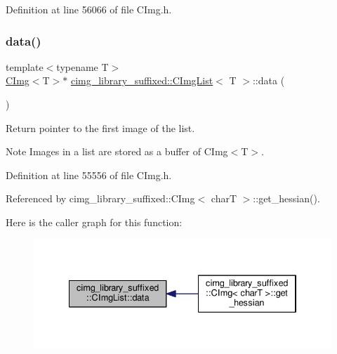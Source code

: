 Definition at line 56066 of file C\+Img.\+h.

\mbox{\label{structcimg__library__suffixed_1_1CImgList_a7824337c659534a3412e5e2373aec595}} 
\subsubsection{\texorpdfstring{data()}{data()}\hspace{0.1cm}{\footnotesize\ttfamily [1/2]}}
{\footnotesize\ttfamily template$<$typename T$>$ \\
\hyperlink{structcimg__library__suffixed_1_1CImg}{C\+Img}$<$T$>$$\ast$ \hyperlink{structcimg__library__suffixed_1_1CImgList}{cimg\+\_\+library\+\_\+suffixed\+::\+C\+Img\+List}$<$ T $>$\+::data (\begin{DoxyParamCaption}{ }\end{DoxyParamCaption})\hspace{0.3cm}{\ttfamily [inline]}}



Return pointer to the first image of the list. 

\begin{DoxyNote}{Note}
Images in a list are stored as a buffer of {\ttfamily C\+Img$<$\+T$>$}. 
\end{DoxyNote}


Definition at line 55556 of file C\+Img.\+h.



Referenced by cimg\+\_\+library\+\_\+suffixed\+::\+C\+Img$<$ char\+T $>$\+::get\+\_\+hessian().

Here is the caller graph for this function\+:
\nopagebreak
\begin{figure}[H]
\begin{center}
\leavevmode
\includegraphics[width=334pt]{d5/d7e/structcimg__library__suffixed_1_1CImgList_a7824337c659534a3412e5e2373aec595_icgraph}
\end{center}
\end{figure}
\mbox{\label{structcimg__library__suffixed_1_1CImgList_a4f396c99fce9bd1ec9c756da06ee5f60}} 
